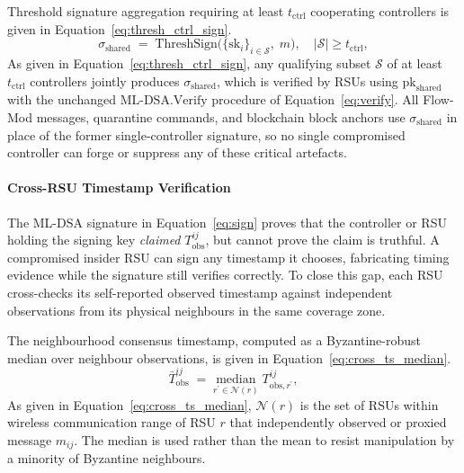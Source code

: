 Threshold signature aggregation requiring at least
$t_{\mathrm{ctrl}}$ cooperating controllers is given in
Equation~\eqref{eq:thresh_ctrl_sign}.
%
\begin{equation}
  \sigma_{\mathrm{shared}} \;=\;
    \mathrm{ThreshSign}\!\bigl(
      \{\mathrm{sk}_i\}_{i \in \mathcal{S}},\; m
    \bigr),
    \quad |\mathcal{S}| \geq t_{\mathrm{ctrl}},
  \label{eq:thresh_ctrl_sign}
\end{equation}
%
As given in Equation~\eqref{eq:thresh_ctrl_sign}, any qualifying
subset $\mathcal{S}$ of at least $t_{\mathrm{ctrl}}$ controllers
jointly produces $\sigma_{\mathrm{shared}}$, which is verified
by RSUs using $\mathrm{pk}_{\mathrm{shared}}$ with the unchanged
$\mathrm{ML\text{-}DSA.Verify}$ procedure of
Equation~\eqref{eq:verify}. All Flow-Mod messages, quarantine
commands, and blockchain block anchors use
$\sigma_{\mathrm{shared}}$ in place of the former single-controller
signature, so no single compromised controller can forge or
suppress any of these critical artefacts.


\paragraph{Cross-RSU Timestamp Verification}
\label{sec:timestamp_verify}

The ML-DSA signature in Equation~\eqref{eq:sign} proves that the
controller or RSU holding the signing key \emph{claimed}
$T_{\mathrm{obs}}^{ij}$, but cannot prove the claim is truthful.
A compromised insider RSU can sign any timestamp it chooses,
fabricating timing evidence while the signature still verifies
correctly. To close this gap, each RSU cross-checks its
self-reported observed timestamp against independent observations
from its physical neighbours in the same coverage zone.

The neighbourhood consensus timestamp, computed as a
Byzantine-robust median over neighbour observations, is given in
Equation~\eqref{eq:cross_ts_median}.
%
\begin{equation}
  \bar{T}_{\mathrm{obs}}^{ij} \;=\;
    \underset{r^{\prime} \in \mathcal{N}(r)}{\mathrm{median}}\;
    T_{\mathrm{obs},r^{\prime}}^{ij},
  \label{eq:cross_ts_median}
\end{equation}
%
As given in Equation~\eqref{eq:cross_ts_median},
$\mathcal{N}(r)$ is the set of RSUs within wireless communication
range of RSU $r$ that independently observed or proxied message
$m_{ij}$. The median is used rather than the mean to resist
manipulation by a minority of Byzantine neighbours.

